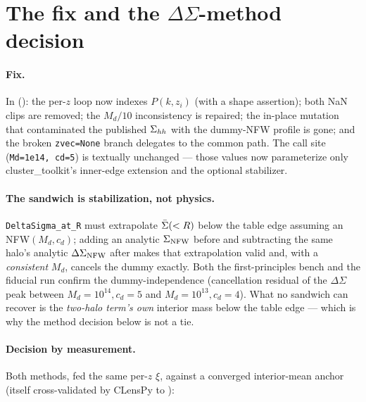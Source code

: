 \section{The fix and the $\Delta\Sigma$-method decision}
\label{sec:fix}

\paragraph{Fix.} In 
(): the per-$z$ loop now indexes
$P(k, z_i)$ (with a shape assertion); both NaN clips are removed; the
$M_d/10$ inconsistency is repaired; the in-place mutation that
contaminated the published $\Sigma_{hh}$ with the dummy-NFW profile is gone;
and the broken \texttt{zvec=None} branch delegates to the common path.
The call site (\texttt{Md=1e14, cd=5}) is textually unchanged --- those
values now parameterize only cluster\_toolkit's inner-edge extension
and the optional stabilizer.

\paragraph{The sandwich is stabilization, not physics.}
\texttt{DeltaSigma\_at\_R} must extrapolate $\bar\Sigma(<R)$ below the table
edge assuming an NFW$(M_d, c_d)$; adding an analytic
$\Sigma_{\rm NFW}$ before and subtracting the same halo's analytic
$\Delta\Sigma_{\rm NFW}$ after makes that extrapolation valid and, with
a \emph{consistent} $M_d$, cancels the dummy exactly. Both the
first-principles bench and the fiducial run confirm the
dummy-independence (cancellation residual \cancResidual{} of the
$\Delta\Sigma$ peak between $M_d{=}10^{14}, c_d{=}5$ and
$M_d{=}10^{13}, c_d{=}4$). What no sandwich can recover is the
\emph{two-halo term's own} interior mass below the table edge --- which
is why the method decision below is not a tie.

\paragraph{Decision by measurement.} Both methods, fed the same per-$z$
$\xi$, against a converged interior-mean anchor (itself
cross-validated by CLensPy to \anchorVsClenspy):

\begin{table}[H]
\centering\small

\caption{Deviation from the converged anchor over
$R \in [0.5, 20]$ cMpc$/h$ at the three DES cluster redshifts.
$D_{\rm direct} = \dDirect$ vs $D_{\rm sandwich} = \dSand$; winner:
\textbf{\methodWinner}.}
\end{table}

